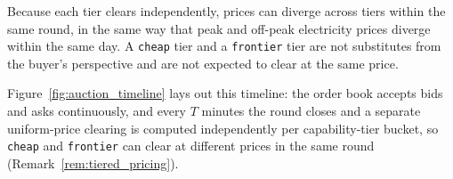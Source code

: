 \begin{remark}
\label{rem:tiered_pricing}
Because each tier clears independently, prices can diverge across tiers
within the same round, in the same way that peak and off-peak electricity
prices diverge within the same day. A \texttt{cheap} tier and a
\texttt{frontier} tier are not substitutes from the buyer's perspective and
are not expected to clear at the same price.
\end{remark}

Figure~\ref{fig:auction_timeline} lays out this timeline: the order book
accepts bids and asks continuously, and every $T$ minutes the round closes
and a separate uniform-price clearing is computed independently per
capability-tier bucket, so \texttt{cheap} and \texttt{frontier} can clear
at different prices in the same round (Remark~\ref{rem:tiered_pricing}).

